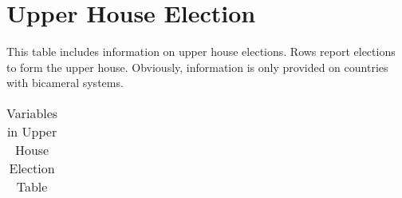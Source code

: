 \section{Upper House Election}\label{sec_uh_election}

This table includes information on upper house elections. 
Rows report elections to form the upper house. 
Obviously, information is only provided on countries with bicameral systems.


\begin{center}
\begin{longtable}{L{4cm} L{6cm} L{3cm}}
\caption{Variables in Upper House Election Table\label{tab_up_election}}


\end{longtable}
\end{center}
